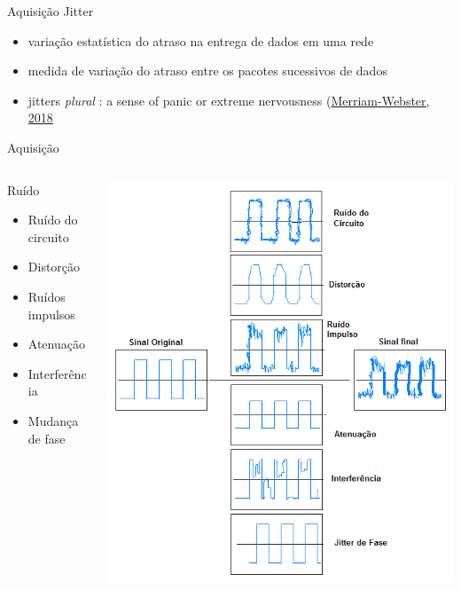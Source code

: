 \documentclass[t]{beamer}
\begin{document}
\begin{frame}{Aquisição}
	Jitter
	\begin{itemize}
		\item variação estatística do atraso na entrega de dados em uma rede
		\item medida de variação do atraso entre os pacotes sucessivos de dados
		\item jitters  \textit{plural} : a sense of panic or extreme nervousness (\href{https://www.merriam-webster.com/dictionary/jitter}{Merriam-Webster, 2018}
	\end{itemize}
\end{frame}

\begin{frame}{Aquisição}
	\begin{columns}[T]
		\begin{column}{0.4\textwidth}
			Ruído
			\begin{itemize}
				\item Ruído do circuito
				\item Distorção
				\item Ruídos impulsos
				\item Atenuação
				\item Interferência
				\item Mudança de fase
			\end{itemize}
		\end{column}
		\begin{column}{0.6\textwidth}
			\includegraphics[height=0.9\textheight]{ruidos}
		\end{column}
	\end{columns}
\end{frame}
\end{document}
